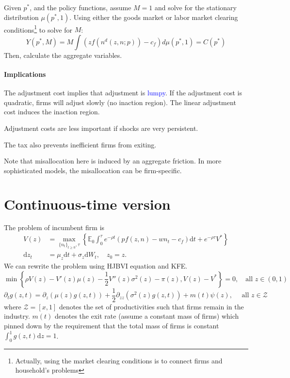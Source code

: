 \documentclass[11pt,a4paper]{article}
\begin{document}
Given $p^*$, and the policy functions, assume $M = 1$ and solve for the stationary distribution $\mu(p^*,1)$. 
Using either the goods market or labor market clearing conditions\footnote{Actually, using the market clearing conditions is to connect firms and household's problems} to solve for $M$: 
$$ Y(p^*,M) = M\int (zf(n^d(z,n;p))-c_f )d\mu(p^*,1)= C(p^*) $$
Then, calculate the aggregate variables.

\paragraph{Implications} The adjustment cost implies that adjustment is \textcolor{blue}{lumpy}. 
If the adjustment cost is quadratic, firms will adjust slowly (no inaction region).
The linear adjustment cost induces the inaction region. 

Adjustment costs are less important if shocks are very persistent. 

The tax also prevents inefficient firms from exiting.

Note that misallocation here is induced by an aggregate friction. In more sophisticated models, the misallocation can be firm-specific.


\section*{Continuous-time version}
The problem of incumbent firm is
\begin{equation}
  \begin{aligned}
    V(z) &= \max_{\{n_t\}_{t\geq 0},\tau} \left\{\mathbb{E}_0 \int_0^\tau e^{-\rho t}(p f(z,n)-w n_t -c_f)\mathrm{d}t+e^{-\rho \tau}V^*\right\}
    \\ \mathrm{d}z_t &= \mu_z \mathrm{d}t + \sigma_z \mathrm{d}W_t,\quad z_0 = z.
  \end{aligned}
\end{equation}
We can rewrite the problem using HJBVI equation and KFE.
\begin{equation}
  \min \left\{\rho V(z)- V'(z)\mu(z)-\frac{1}{2}V''(z)\sigma^2(z)-\pi(z),V(z)-V^*\right\} = 0 ,\quad \text{all } z\in (0,1)
\end{equation}
\begin{equation}
  \partial_t g(z,t) = \partial_z(\mu(z)g(z,t)) + \frac{1}{2}\partial_{zz}(\sigma^2(z)g(z,t))+m(t)\psi(z), \quad \text{ all } z\in \mathcal{Z}
\end{equation}
where $\mathcal{Z}=[x,1]$ denotes the set of productivities such that firms remain in the industry. $m(t)$ denotes the exit rate (assume a constant mass of firms) which pinned down by the requirement that the total mass of firms is constant $\int_0^1 g(z,t)\mathrm{d}z = 1$. 
\end{document}

